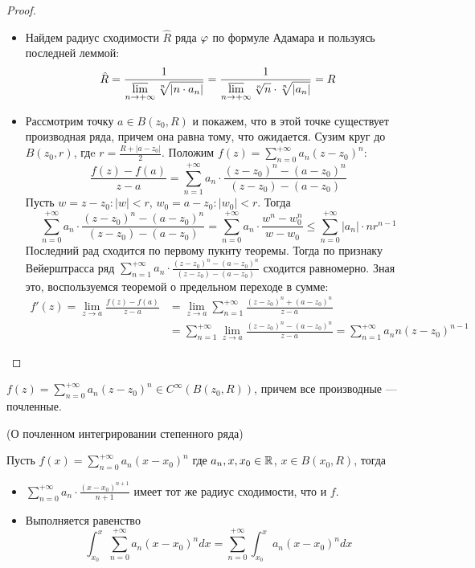 \begin{proof}
    \enewline
    \begin{itemize}
        \item Найдем радиус сходимости $\hat{R}$ ряда $\varphi$ по формуле Адамара и
        пользуясь последней леммой:
\[
    \hat{R} = \frac{1}{\displaystyle \varlimsup_{n \to +\infty}{\sqrt[n]{|n
    \cdot a_n|}}} = \frac{1}{\displaystyle \varlimsup_{n \to
    +\infty}{\sqrt[n]{n} \cdot \sqrt[n]{|a_n|}}} = R
\]
        \item Рассмотрим точку $a \in B(z_0, R)$ и покажем, что в этой точке
        существует производная ряда, причем она равна тому, что ожидается.
        Сузим круг до $B(z_0, r)$, гдe $r = \frac{R + |a - z_0|}{2}$.
        Положим $\displaystyle f(z) = \sum_{n = 0}^{+\infty}{a_n(z - z_0)^n}$:
\[
    \frac{f(z) - f(a)}{z - a} = \sum_{n = 1}^{+\infty}{a_n \cdot
    \frac{(z - z_0)^n - (a - z_0)^n}{(z - z_0) - (a - z_0)}}
\]
    Пусть $w = z - z_0: |w| < r$, $w_0 = a - z_0: |w_0| < r$. Тогда
\[
    \sum_{n = 0}^{+\infty}{a_n \cdot \frac{(z - z_0)^n - (a - z_0)^n}{(z - z_0)
    - (a - z_0)}}
    = \sum_{n = 0}^{+\infty}{a_n \cdot \frac{w^n - w^n_0}{w - w_0}}
    \leqslant \sum_{n = 0}^{+\infty}{|a_n| \cdot nr^{n - 1}}
\]
    Последний рад сходится по первому пукнту теоремы. Тогда по признаку
    Вейерштрасса ряд $\displaystyle \sum_{n = 1}^{+\infty}{a_n \cdot
    \frac{(z - z_0)^n - (a - z_0)^n}{(z - z_0) - (a - z_0)}}$
    сходится равномерно. Зная это, воспользуемся теоремой о предельном переходе
    в сумме:
\begin{align*}
    f'(z) = \lim_{z \to a}{\frac{f(z) - f(a)}{z - a}} &= \lim_{z \to a}
    {\sum_{n = 1}^{+\infty}{\frac{(z - z_0)^n + (a - z_0)^n}{z - a}}}
    \\ &= \sum_{n = 1}^{+\infty}{\lim_{z \to a}{\frac{(z - z_0)^n - (a -
    z_0)^n}{z - a}}} = \sum_{n = 1}^{+\infty}{a_n n(z - z_0)^{n - 1}}
\end{align*}
    \end{itemize}
\end{proof}

\begin{corollary}
    $\displaystyle f(z) = \sum_{n = 0}^{+\infty}{a_n(z - z_0)^n} \in
    C^{\infty}(B(z_0, R))$, причем все производные --- почленные.
\end{corollary}

\begin{corollary}(О почленном интегрировании степенного ряда)

    Пусть $f(x) = \displaystyle \sum_{n = 0}^{+\infty}{a_n (x - x_0)^n}$ где
    $a_n, x, x_0 \in \mathbb{R}$, $x \in B(x_0, R)$, тогда
\begin{itemize}
    \item $\displaystyle \sum_{n = 0}^{+\infty}{a_n \cdot \frac{(x - x_0)^{n +
    1}}{n + 1}}$ имеет тот же радиус сходимости, что и $f$.
    \item Выполняется равенство
\[
    \int_{x_0}^{x}{\sum_{n = 0}^{+\infty}{a_n (x - x_0)^n} dx}
    = \sum_{n = 0}^{+\infty}{\int_{x_0}^{x}{a_n(x - x_0)^n dx}}
\]
\end{itemize}
\end{corollary}

